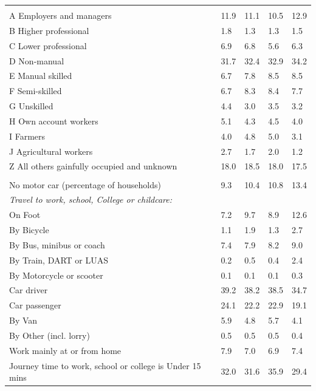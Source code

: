 \documentclass{article}
\begin{document}
\begin{table}[h]
\begin{tabular}{KTTTT}
\hline
    \\ 
    \hline
A Employers and managers & 11.9& 11.1& 10.5& 12.9\\
B Higher professional & 1.8& 1.3& 1.3& 1.5\\
C Lower professional & 6.9& 6.8& 5.6& 6.3\\
D Non-manual & 31.7& 32.4& 32.9& 34.2\\
E Manual skilled & 6.7& 7.8& 8.5& 8.5\\
F Semi-skilled & 6.7& 8.3& 8.4& 7.7\\
G Unskilled & 4.4& 3.0& 3.5& 3.2\\
H Own account workers & 5.1& 4.3& 4.5& 4.0\\
I Farmers & 4.0& 4.8& 5.0& 3.1\\
J Agricultural workers & 2.7& 1.7& 2.0& 1.2\\
Z All others gainfully occupied and unknown & 18.0& 18.5& 18.0& 17.5\\
\hline
{}\hline
    \\ 
    \hline
No motor car (percentage of households) &  9.3& 10.4& 10.8& 
13.4\\
    \hline 
\emph{Travel to work, school, College or childcare:} & & & \\
\quad On Foot &  7.2&  9.7&  8.9& 12.6\\ 
\quad By Bicycle & 1.1& 1.9& 1.3& 2.7\\ 
\quad By Bus, minibus or coach & 7.4& 7.9& 8.2& 9.0\\
\quad By Train, DART or LUAS & 0.2& 0.5& 0.4& 2.4\\
\quad By Motorcycle or scooter & 0.1& 0.1& 0.1& 0.3\\
\quad Car driver & 39.2 & 38.2& 38.5& 34.7\\
\quad Car passenger & 24.1& 22.2& 22.9& 19.1\\
\quad By Van & 5.9& 4.8& 5.7& 4.1\\
\quad By Other (incl. lorry) & 0.5& 0.5& 0.5& 0.4\\
    \hline
Work mainly at or from home & 7.9& 7.0& 6.9& 7.4\\
Journey time to work, school or college is Under 15 mins & 32.0& 31.6& 35.9& 29.4\\

\end{tabular}
\end{table}
\end{document}
